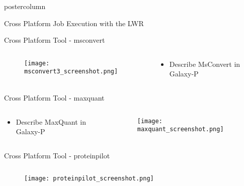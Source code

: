 \documentclass[final]{beamer}
\begin{document}
\begin{frame}
\begin{columns}
\begin{column}{.33\textwidth}
\begin{beamercolorbox}[center,wd=\textwidth]{postercolumn}
\begin{minipage}[T]{.98\textwidth}
{\begin{block}{Cross Platform Job Execution with the LWR}
              \end{block}
              \vfill
              \begin{block}{Cross Platform Tool - msconvert}
                \begin{columns}
                  \begin{column}{.39\textwidth}
                    \begin{figure}
                      \texttt{[image: msconvert3\_screenshot.png]}
                    \end{figure}              
                  \end{column}
                  \begin{column}{.60\textwidth}
                    \begin{itemize}
                      \item Describe MsConvert in Galaxy-P
                    \end{itemize}
                  \end{column}  
                \end{columns}            
              \end{block}
              \vfill
              \begin{block}{Cross Platform Tool - maxquant}
                \begin{columns}
                  \begin{column}{.60\textwidth}
                    \begin{itemize}
                      \item Describe MaxQuant in Galaxy-P
                    \end{itemize}
                  \end{column} 
                  \begin{column}{.39\textwidth}
                    \begin{figure}
                      \texttt{[image: maxquant\_screenshot.png]}
                    \end{figure}              
                  \end{column}
                \end{columns}
              \end{block}
              \vfill
              \begin{block}{Cross Platform Tool - proteinpilot}
                \begin{columns}
                  \begin{column}{.39\textwidth}
                    \begin{figure}
                      \texttt{[image: proteinpilot\_screenshot.png]}
                    \end{figure}              
                  \end{column}


\end{columns}
\end{block}}
\end{minipage}
\end{beamercolorbox}
\end{column}
\end{columns}
\end{frame}
\end{document}
